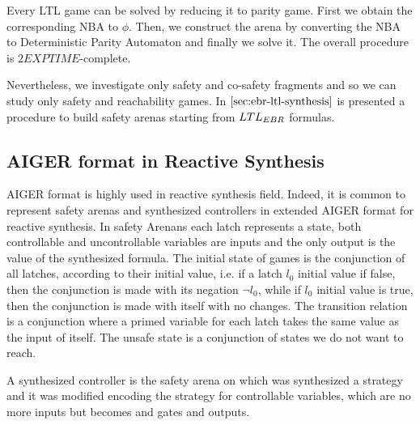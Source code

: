 Every LTL game can be solved by reducing it to parity game. 
First we obtain the corresponding NBA to $\phi$. 
Then, we construct the arena by converting the NBA to Deterministic Parity Automaton and finally we solve it. 
The overall procedure is $2EXPTIME$-complete.

Nevertheless, we investigate only safety and co-safety fragments and so we can study only safety and reachability games. 
In $\autoref{sec:ebr-ltl-synthesis}$ is presented a procedure to build safety arenas starting from $LTL_{EBR}$ formulas.

\subsection{AIGER format in Reactive Synthesis}
AIGER format is highly used in reactive synthesis field. Indeed, it is common to represent safety arenas and synthesized controllers in extended AIGER format for reactive synthesis.
In safety Arenans each latch represents a state, both controllable and uncontrollable variables are inputs and the only output is the value of the synthesized formula.
The initial state of games is the conjunction of all latches, according to their initial value, i.e. if a latch $l_0$ initial value if false, then the conjunction is made with its negation $\neg l_0$, while if $l_0$ initial value is true, then the conjunction is made with itself with no changes.
The transition relation is a conjunction where a primed variable for each latch takes the same value as the input of itself.
The unsafe state is a conjunction of states we do not want to reach.

A synthesized controller is the safety arena on which was synthesized a strategy and it was modified encoding the strategy for controllable variables, which are no more inputs but becomes and gates and outputs. 

